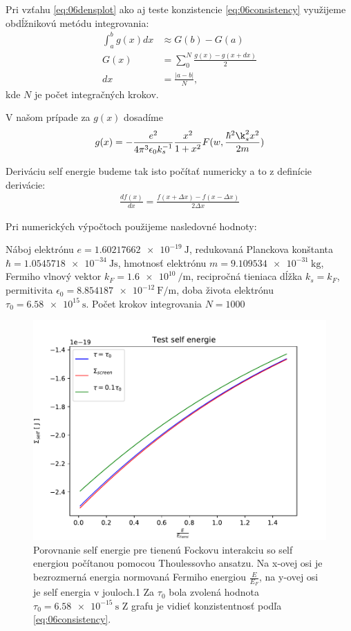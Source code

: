 Pri vzťahu \eqref{eq:06densplot} ako aj teste konzistencie \eqref{eq:06consistency} využijeme obdĺžnikovú metódu integrovania:
\begin{align}
\int_a^b g(x)dx &\approx G(b)-G(a)\\
G(x) &= \sum_0^N \frac{g(x)-g(x+dx)}{2}\\
dx &= \frac{|a-b|}{N} \text{,}
\end{align}
kde $N$ je počet integračných krokov. 

V našom prípade za $g(x)$ dosadíme 
\begin{align}
g(x) = -\frac{e^2}{4\pi^3\epsilon_0 k_s^{-1}} \frac{x^2}{1+x^2}F(w,\frac{\hbar^2\k_s^2 x^2}{2m})
\end{align}

Deriváciu self energie budeme tak isto počítať numericky a to z definície derivácie:
\begin{align}
\frac{df(x)}{d x} = \frac{f(x+\Delta x)-f(x-\Delta x)}{2\Delta x}
\end{align}

Pri numerických výpočtoch použijeme nasledovné hodnoty:

Náboj elektrónu $e = \SI{1.60217662e-19}{\joule}$, redukovaná Planckova konštanta $\hbar = \SI{1.0545718e-34}{\joule\second}$, hmotnosť elektrónu
 $m = \SI{9.109534e-31}{\kilo\gram}$, Fermiho vlnový vektor $k_F = \SI{1.6e10}{\per\meter}$, recipročná tieniaca dĺžka $k_s=k_F$, permitivita
 $ \epsilon_0 = \SI{8.854187e-12}{\farad\per\meter}$, doba života elektrónu $\tau_0 = \SI{6.58e15}{\second}$. Počet krokov integrovania $N=1000$
\begin{figure}[H]
\centering
\includegraphics[scale=1]{grafy/plot_se_test}
\caption{Porovnanie self energie pre tienenú Fockovu interakciu so self energiou počítanou pomocou Thoulessovho ansatzu. Na x-ovej osi je bezrozmerná energia normovaná Fermiho energiou $\frac{E}{E_F}$, na y-ovej osi je self energia v jouloch.1 Za $\tau_0$ bola zvolená hodnota $\tau_0=\SI{6.58e-15}{\second}$ Z grafu je vidieť konzistentnosť podľa \eqref{eq:06consistency}.}
\label{fig:plot_test} 
\end{figure}

